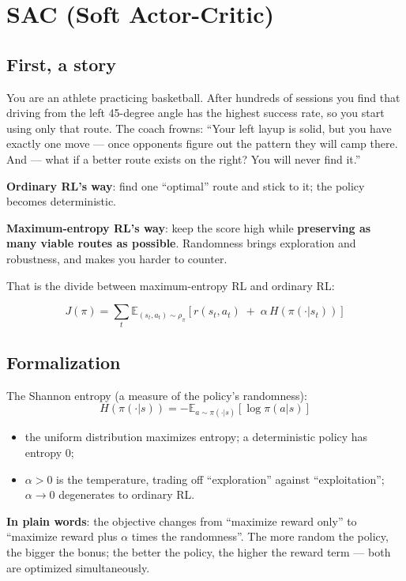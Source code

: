 \documentclass{article}
\begin{document}
\section*{SAC (Soft Actor-Critic)}

\subsection*{First, a story}

You are an athlete practicing basketball. After hundreds of sessions you find that driving from the left 45-degree angle has the highest success rate, so you start using only that route. The coach frowns: ``Your left layup is solid, but you have exactly one move --- once opponents figure out the pattern they will camp there. And --- what if a better route exists on the right? You will never find it.''

\textbf{Ordinary RL's way}: find one ``optimal'' route and stick to it; the policy becomes deterministic.

\textbf{Maximum-entropy RL's way}: keep the score high while \textbf{preserving as many viable routes as possible}. Randomness brings exploration and robustness, and makes you harder to counter.

That is the divide between maximum-entropy RL and ordinary RL:

\[
\boxed{J(\pi) = \sum_t \mathbb{E}_{(s_t,a_t)\sim\rho_\pi}\!\left[r(s_t,a_t) \;+\; \alpha\,H\!\left(\pi(\cdot|s_t)\right)\right]}
\]

\subsection*{Formalization}

The Shannon entropy (a measure of the policy's randomness):
\[
H(\pi(\cdot|s)) = -\mathbb{E}_{a\sim\pi(\cdot|s)}\!\left[\log\pi(a|s)\right]
\]

\begin{itemize}
  \item the uniform distribution maximizes entropy; a deterministic policy has entropy $0$;
  \item $\alpha > 0$ is the temperature, trading off ``exploration'' against ``exploitation''; $\alpha \to 0$ degenerates to ordinary RL.
\end{itemize}

\textbf{In plain words}: the objective changes from ``maximize reward only'' to ``maximize reward plus $\alpha$ times the randomness''. The more random the policy, the bigger the bonus; the better the policy, the higher the reward term --- both are optimized simultaneously.
\end{document}
